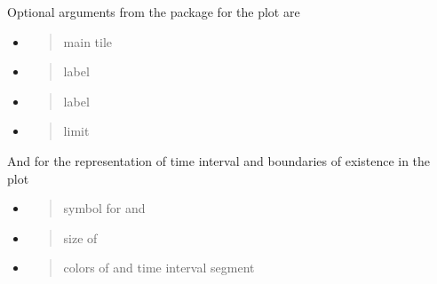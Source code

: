\documentclass[a4paper,12pt,english]{sphinxhowto}
\begin{document}
Optional arguments from the  package for the plot are
\begin{itemize}
\item {} 
\begin{quote}

main tile
\end{quote}

\item {} 
\begin{quote}

 label
\end{quote}

\item {} 
\begin{quote}

 label
\end{quote}

\item {} 
\begin{quote}

 limit
\end{quote}

\end{itemize}


And for the representation of time interval and boundaries of existence in the plot
\begin{itemize}
\item {} 
\begin{quote}

symbol for  and 
\end{quote}

\item {} 
\begin{quote}

size of 
\end{quote}

\item {} 
\begin{quote}

colors of  and time interval segment
\end{quote}

\end{itemize}
\end{document}
